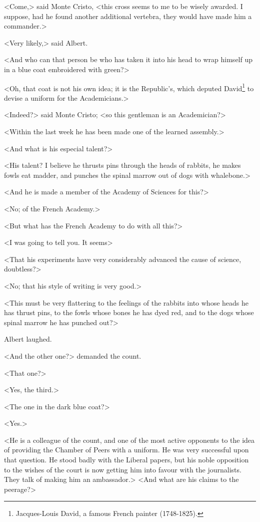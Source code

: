  <Come,> said Monte Cristo, <this cross seems to me to be wisely awarded. I suppose, had he found another additional vertebra, they would have made him a commander.> 

 <Very likely,> said Albert. 

 <And who can that person be who has taken it into his head to wrap himself up in a blue coat embroidered with green?> 

 <Oh, that coat is not his own idea; it is the Republic's, which deputed David\footnote{Jacques-Louis David, a famous French painter (1748-1825). } to devise a uniform for the Academicians.> 

 <Indeed?> said Monte Cristo; <so this gentleman is an Academician?> 

 <Within the last week he has been made one of the learned assembly.> 

 <And what is his especial talent?> 

 <His talent? I believe he thrusts pins through the heads of rabbits, he makes fowls eat madder, and punches the spinal marrow out of dogs with whalebone.> 

 <And he is made a member of the Academy of Sciences for this?> 

 <No; of the French Academy.> 

 <But what has the French Academy to do with all this?> 

 <I was going to tell you. It seems\longdash> 

 <That his experiments have very considerably advanced the cause of science, doubtless?> 

 <No; that his style of writing is very good.> 

 <This must be very flattering to the feelings of the rabbits into whose heads he has thrust pins, to the fowls whose bones he has dyed red, and to the dogs whose spinal marrow he has punched out?> 

 Albert laughed. 

 <And the other one?> demanded the count. 

 <That one?> 

 <Yes, the third.> 

 <The one in the dark blue coat?> 

 <Yes.> 

 <He is a colleague of the count, and one of the most active opponents to the idea of providing the Chamber of Peers with a uniform. He was very successful upon that question. He stood badly with the Liberal papers, but his noble opposition to the wishes of the court is now getting him into favour with the journalists. They talk of making him an ambassador.>  <And what are his claims to the peerage?> 

